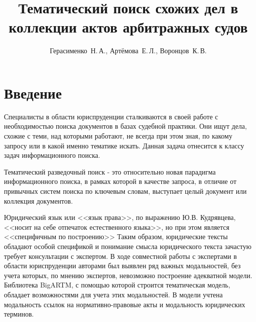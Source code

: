 \documentclass[12pt]{article}
\title
    [Тематический поиск схожих дел в коллекции актов арбитражных судов] %
    {Тематический поиск схожих дел в коллекции актов арбитражных судов}
\author
    [Герасименко~Н.\,А.] %
    {Герасименко~Н.\,А., Артёмова~Е.\,Л., Воронцов~К.\,В.} %
    [Герасименко~Н.\,А.$^1$, Артёмова~Е.\,Л.$^2$, Воронцов~К.\,В.$^3$] %
\begin{document}
\maketitle
\section{Введение}




Специалисты в области юриспруденции сталкиваются в своей работе с необходимостью поиска документов в базах судебной практики. Они ищут дела, схожие с теми, над которыми работают, не всегда при этом зная, по какому запросу или в какой именно тематике искать. Данная задача отнесится к классу задач информационного поиска.

Тематический разведочный поиск - это относительно новая парадигма информационного поиска, в рамках которой в качестве запроса, в отличие от привычных систем поиска по ключевым словам, выступает целый документ или коллекция документов.


Юридический язык или <<язык права>>, по выражению Ю.В. Кудрявцева, <<носит на себе отпечаток естественного языка>>, но при этом является <<специфичным по построению>> 
\cite{Kudriavtsev1981} Таким образом, юридические тексты обладают особой спецификой и понимание смысла юридического текста зачастую требует консультации с экспертом.
В ходе совместной работы с экспертами в области юриспруденции авторами был выявлен ряд важных модальностей, без учета которых, по мнению экспертов, невозможно построение адекватной модели. Библиотека BigARTM\cite{BigARTM2015}, с помощью которой строится тематическая модель, обладает возможностями для учета этих модальностей. В модели учтена модальность ссылок на нормативно-правовые акты и модальность юридических терминов.
\end{document}
